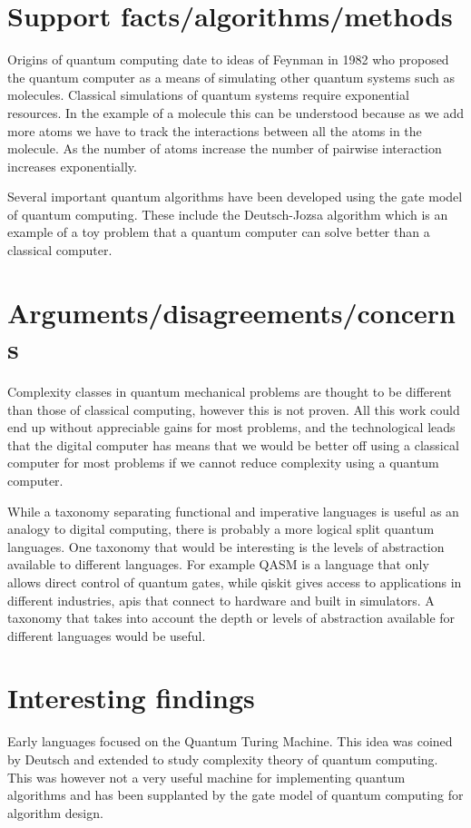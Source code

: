 \documentclass{article}
\begin{document}
\section{Support facts/algorithms/methods}

Origins of quantum computing date to ideas of Feynman in 1982 who proposed the quantum computer as a means of simulating other quantum systems such as molecules. Classical simulations of quantum systems require exponential resources. In the example of a molecule this can be understood because as we add more atoms we have to track the interactions between all the atoms in the molecule. As the number of atoms increase the number of pairwise interaction increases exponentially.

Several important quantum algorithms have been developed using the gate model of quantum computing. These include the Deutsch-Jozsa algorithm which is an example of a toy problem that a quantum computer can solve better than a classical computer. 

\section{Arguments/disagreements/concerns}

Complexity classes in quantum mechanical problems are thought to be different than those of classical computing, however this is not proven. All this work could end up without appreciable gains for most problems, and the technological leads that the digital computer has means that we would be better off using a classical computer for most problems if we cannot reduce complexity using a quantum computer.

While a taxonomy separating functional and imperative languages is useful as an analogy to digital computing, there is probably a more logical split quantum languages. One taxonomy that would be interesting is the levels of abstraction available to different languages. For example QASM is a language that only allows direct control of quantum gates, while qiskit gives access to applications in different industries, apis that connect to hardware and built in simulators. A taxonomy that takes into account the depth or levels of abstraction available for different languages would be useful.

\section{Interesting findings}
Early languages focused on the Quantum Turing Machine. This idea was coined by Deutsch and extended to study complexity theory of quantum computing. This was however not a very useful machine for implementing quantum algorithms and has been supplanted by the gate model of quantum computing for algorithm design.
\end{document}
